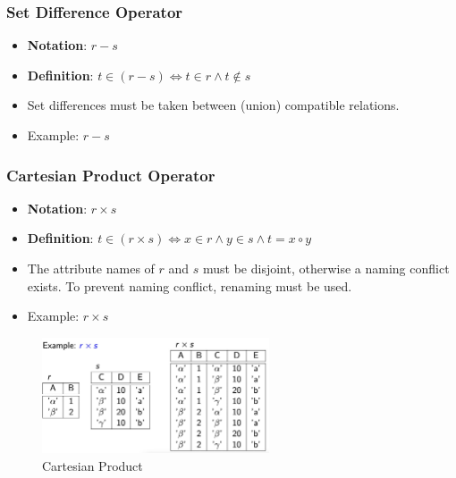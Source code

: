 \subsubsection{Set Difference Operator}
\begin{itemize}[label=\(\rhd\)]
    \item \textbf{Notation}: $r-s$
    \item \textbf{Definition}: $t\in (r-s) \Leftrightarrow t \in r \land t \notin s$
    \item Set differences must be taken between (union) compatible relations.
    \item Example: $r-s$
\end{itemize}

\subsubsection{Cartesian Product Operator}
\begin{itemize}[label=\(\rhd\)]
    \item \textbf{Notation}: $r \times s$
    \item \textbf{Definition}: $t \in (r \times s) \Leftrightarrow x \in r \land y \in s \land t = x \circ y$
    \item The attribute names of $r$ and $s$ must be disjoint, otherwise a naming conflict exists. To prevent naming conflict, renaming must be used.
    \item Example: $r \times s$
\end{itemize}

\begin{figure}[H]
\centering
\includegraphics[width=0.6\textwidth]{images/Screenshot 2024-05-01 at 18.40.41.jpg}
\caption{Cartesian Product}
\end{figure}

